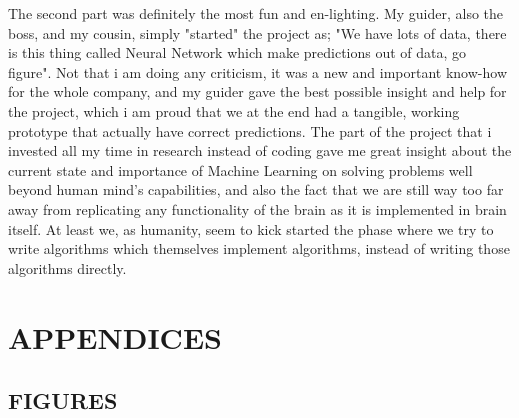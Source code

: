 \documentclass[titlepage, a4paper, 14pt]{extarticle} %
\begin{document}
The second part was definitely the most fun and en-lighting. My guider, also the boss, and my cousin, simply "started" the project as; "We have lots of data, there is this thing called Neural Network which make predictions out of data, go figure". Not that i am doing any criticism, it was a new and important know-how for the whole company, and my guider gave the best possible insight and help for the project, which i am proud that we at the end had a tangible, working prototype that actually have correct predictions. The part of the project that i invested all my time in research instead of coding gave me great insight about the current state and importance of Machine Learning on solving problems well beyond human mind's capabilities, and also the fact that we are still way too far away from replicating any functionality of the brain as it is implemented in brain itself. At least we, as humanity, seem to kick started the phase where we try to write algorithms which themselves implement algorithms, instead of writing those algorithms directly. \\


\section{APPENDICES} \label{apendis}




\subsection{FIGURES} \label{fig}




\begin{table}[H]
\centering
{}
\caption{ Inference with different strategies }
\label{my-label}
\end{table}
\end{document}
